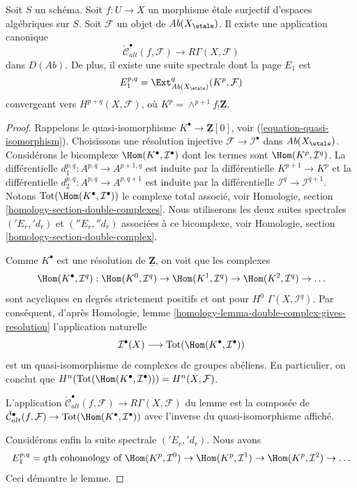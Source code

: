 \begin{lemma}
\label{lemma-alternating-cech-to-cohomology}
Soit $S$ un schéma. Soit $f : U \to X$ un morphisme étale surjectif
d'espaces algébriques sur $S$. Soit $\mathcal{F}$ un objet de
$\textit{Ab}(X_\etale)$. Il existe une application canonique
$$
\check{\mathcal{C}}^\bullet_{alt}(f, \mathcal{F})
\longrightarrow
R\Gamma(X, \mathcal{F})
$$
dans $D(\textit{Ab})$. De plus, il existe une suite spectrale dont la page $E_1$ est
$$
E_1^{p, q} =
\Ext_{\textit{Ab}(X_\etale)}^q(K^p, \mathcal{F})
$$
convergeant vers $H^{p + q}(X, \mathcal{F})$, où
$K^p = \wedge^{p + 1}f_!\underline{\mathbf{Z}}$.
\end{lemma}

\begin{proof}
Rappelons le quasi-isomorphisme
$K^\bullet \to \underline{\mathbf{Z}}[0]$, voir
(\ref{equation-quasi-isomorphism}).
Choisissons une résolution injective $\mathcal{F} \to \mathcal{I}^\bullet$
dans $\textit{Ab}(X_\etale)$. Considérons le bicomplexe
$\Hom(K^\bullet, \mathcal{I}^\bullet)$ dont les termes sont
$\Hom(K^p, \mathcal{I}^q)$. La différentielle
$d_1^{p, q} : A^{p, q} \to A^{p + 1, q}$
est induite par la différentielle $K^{p + 1} \to K^p$
et la différentielle $d_2^{p, q} : A^{p, q} \to A^{p, q + 1}$ est induite par
la différentielle
$\mathcal{I}^q \to \mathcal{I}^{q + 1}$.
Notons $\text{Tot}(\Hom(K^\bullet, \mathcal{I}^\bullet))$
le complexe total associé, voir
Homologie, section \ref{homology-section-double-complexes}.
Nous utiliserons les deux suites spectrales
$({}'E_r, {}'d_r)$ et $({}''E_r, {}''d_r)$
associées à ce bicomplexe, voir
Homologie, section \ref{homology-section-double-complex}.

\medskip\noindent
Comme $K^\bullet$ est une résolution de $\underline{\mathbf{Z}}$,
on voit que les complexes
$$
\Hom(K^\bullet, \mathcal{I}^q) :
\Hom(K^0, \mathcal{I}^q) \to
\Hom(K^1, \mathcal{I}^q) \to
\Hom(K^2, \mathcal{I}^q) \to \ldots
$$
sont acycliques en degrés strictement positifs et ont pour $H^0$
$\Gamma(X, \mathcal{I}^q)$. Par conséquent, d'après
Homologie, lemme \ref{homology-lemma-double-complex-gives-resolution}
l'application naturelle
$$
\mathcal{I}^\bullet(X) \longrightarrow
\text{Tot}(\Hom(K^\bullet, \mathcal{I}^\bullet))
$$
est un quasi-isomorphisme de complexes de groupes abéliens.
En particulier, on conclut que
$H^n(\text{Tot}(\Hom(K^\bullet, \mathcal{I}^\bullet))) = H^n(X, \mathcal{F})$.

\medskip\noindent
L'application $\check{\mathcal{C}}^\bullet_{alt}(f, \mathcal{F}) \to
R\Gamma(X, \mathcal{F})$ du lemme est la composée de
$\check{\mathcal{C}}^\bullet_{alt}(f, \mathcal{F}) \to
\text{Tot}(\Hom(K^\bullet, \mathcal{I}^\bullet))$
avec l'inverse du quasi-isomorphisme affiché.

\medskip\noindent
Considérons enfin la suite spectrale $({}'E_r, {}'d_r)$.
Nous avons
$$
E_1^{p, q} = q\text{th cohomology of }
\Hom(K^p, \mathcal{I}^0) \to
\Hom(K^p, \mathcal{I}^1) \to
\Hom(K^p, \mathcal{I}^2) \to \ldots
$$
Ceci démontre le lemme.
\end{proof}

